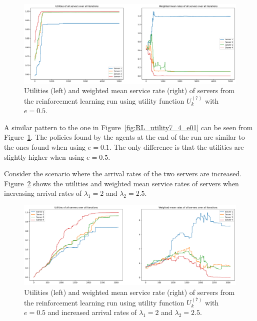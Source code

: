 \begin{figure}[H]
    \includegraphics[width=\textwidth]{chapters/06_agent_based_extension/Bin/reinforcement_learning_results/utility_7/u7_4_e05.pdf}
    \caption{Utilities (left) and weighted mean service rate (right) of servers
    from the reinforcement learning run using utility function \(U_k^{(7)}\)
    with \(e = 0.5\).}
    \label{fig:RL_utility7_4_e05}
\end{figure}

A similar pattern to the one in Figure~\ref{fig:RL_utility7_4_e01} can be seen
from Figure~\ref{fig:RL_utility7_4_e05}.
The policies found by the agents at the end of the run are similar to the ones
found when using \(e = 0.1\).
The only difference is that the utilities are slightly higher when using
\(e = 0.5\).

Consider the scenario where the arrival rates of the two servers are increased.
Figure~\ref{fig:RL_utility7_4_e05_Lambda_45} shows the utilities and weighted
mean service rates of servers when increasing arrival rates of
\(\lambda_1 = 2\) and \(\lambda_2 = 2.5\).

\begin{figure}[H]
    \includegraphics[width=\textwidth]{chapters/06_agent_based_extension/Bin/reinforcement_learning_results/utility_7/u7_4_e05_Lambda_45.pdf}
    \caption{Utilities (left) and weighted mean service rate (right) of servers
    from the reinforcement learning run using utility function \(U_k^{(7)}\)
    with \(e = 0.5\) and increased arrival rates of \(\lambda_1 = 2\) and
    \(\lambda_2 = 2.5\).}
    \label{fig:RL_utility7_4_e05_Lambda_45}
\end{figure}


